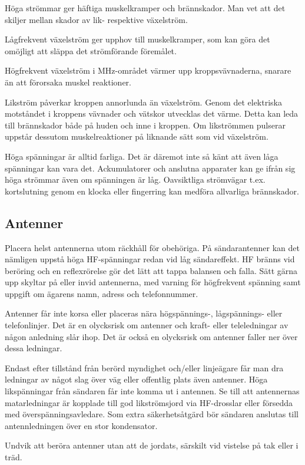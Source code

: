 Höga strömmar ger häftiga muskelkramper och brännskador. Man vet att
det skiljer mellan skador av lik- respektive växelström.

Lågfrekvent växelström ger upphov till muskelkramper, som kan göra det
omöjligt att släppa det strömförande föremålet.

Högfrekvent växelström i MHz-området värmer upp kroppsvävnaderna,
snarare än att förorsaka muskel reaktioner.

Likström påverkar kroppen annorlunda än växelström. Genom det
elektriska motståndet i kroppens vävnader och vätskor utvecklas det
värme. Detta kan leda till brännskador både på huden och inne i
kroppen.  Om likströmmen pulserar uppstår dessutom muskelreaktioner på
liknande sätt som vid växelström.

Höga spänningar är alltid farliga. Det är däremot inte så känt att
även låga spänningar kan vara det. Ackumulatorer och anslutna
apparater kan ge ifrån sig höga strömmar även om spänningen är
låg. Oavsiktliga strömvägar t.ex. kortslutning genom en klocka eller
fingerring kan medföra allvarliga brännskador.

\subsection{Antenner}

Placera helst antennerna utom räckhåll för obehöriga. På
sändarantenner kan det nämligen uppstå höga HF-spänningar redan vid
låg sändareffekt. HF bränns vid beröring och en reflexrörelse gör det
lätt att tappa balansen och falla. Sätt gärna upp skyltar på eller
invid antennerna, med varning för högfrekvent spänning samt uppgift om
ägarens namn, adress och telefonnummer.

Antenner får inte korsa eller placeras nära högspännings-,
lågspännings- eller telefonlinjer. Det är en olycksrisk om antenner
och kraft- eller teleledningar av någon anledning slår ihop. Det är
också en olycksrisk om antenner faller ner över dessa ledningar.

Endast efter tillstånd från berörd myndighet och/eller linjeägare får
man dra ledningar av något slag över väg eller offentlig plats även
antenner.  Höga likspänningar från sändaren får inte komma ut i
antennen. Se till att antennernas matarledningar är kopplade till god
likströmsjord via HF-drosslar eller försedda med
överspänningsavledare.  Som extra säkerhetsåtgärd bör sändaren
anslutas till antennledningen över en stor kondensator.

Undvik att beröra antenner utan att de jordats, särskilt vid vistelse
på tak eller i träd.

